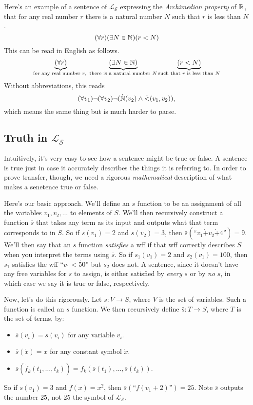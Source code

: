 Here's an example of a sentence of $\mathcal{L}_\mathscr{S}$ expressing the \textit{Archimedian property} of $\mathbb{R}$, that for any real number $r$ there is a natural number $N$ such that $r$ is less than $N$.
\[ (\forall r)(\exists N \in \mathbb{N})(r < N) \]
This can be read in English as follows.
\[ \underbrace{(\forall r)}_{\text{for any real number $r$,\ }}\underbrace{(\exists N \in \mathbb{N})}_{\text{there is a natural number $N$}}\underbrace{(r < N)}_{\text{such that $r$ is less than $N$}} \]
Without abbreviations, this reads
\[ (\forall v_1) \neg (\forall v_2) \neg (\dot {\mathbb{N}} (v_2) \land \dot <(v_1, v_2)), \]
which means the same thing but is much harder to parse.


\subsection{Truth in \texorpdfstring{$\mathcal{L}_\mathscr{S}$}{L S}}\label{sec:truthInLS}
Intuitively, it's very easy to see how a sentence might be true or false. A sentence is true just in case it accurately describes the things it is referring to. In order to prove transfer, though, we need a rigorous \textit{mathematical} description of what makes a senetence true or false.

Here's our basic approach. We'll define an $s$ function to be an assignment of all the variables $v_1, v_2, \ldots$ to elements of $S$. We'll then recursively construct a function $\bar s$ that takes any term as its input and outputs what that term corresponds to in $S$. So if $s(v_1) = 2$ and $s(v_2) = 3$, then $\bar s(\text{``}v_1 \dot + v_2 \dot + \dot 4\text{''}) = 9$. We'll then say that an $s$ function \textit{satisfies} a wff if that wff correctly describes $S$ when you interpret the terms using $\bar s$. So if $s_1 (v_1) = 2$ and $s_2(v_1) = 100$, then $s_1$ satisfies the wff ``$v_1 < \dot{50}$'' but $s_2$ does not. A sentence, since it doesn't have any free variables for $s$ to assign, is either satisfied by \textit{every} $s$ or by \textit{no} $s$, in which case we say it is true or false, respectively.

Now, let's do this rigorously. Let $s: V \to S$, where $V$ is the set of variables. Such a function is called an $s$ function. We then recursively define $\bar s : T \to S$, where $T$ is the set of terms, by:
\begin{itemize}
    \item $\bar s(v_i) = s(v_i)$ for any variable $v_i$.
    \item $\bar s(\dot x) = x$ for any constant symbol $\dot x$.
    \item $\bar s(\dot f_k(t_1, \ldots, t_k)) = f_k(\bar s(t_1), \ldots, \bar s(t_k))$.
\end{itemize}
So if $s(v_1) = 3$ and $f(x) = x^2$, then $\bar s(\text{``}f(v_1  +  2)\text{''}) = 25$. Note $\bar s$ outputs the number $25$, not $\dot{25}$ the symbol of $\mathcal{L}_\mathscr{S}$.

